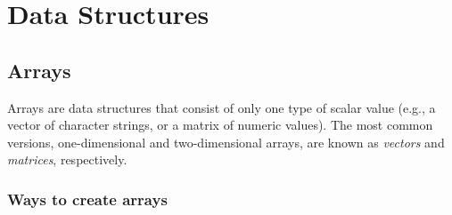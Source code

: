 \section{Data Structures}

\subsection{Arrays}

Arrays are data structures that consist of only one type of scalar
value (e.g., a vector of character strings, or a matrix of numeric
values).  The most common versions, one-dimensional and
two-dimensional arrays, are known as \emph{vectors} and
\emph{matrices}, respectively.  

\subsubsection*{Ways to create arrays}
